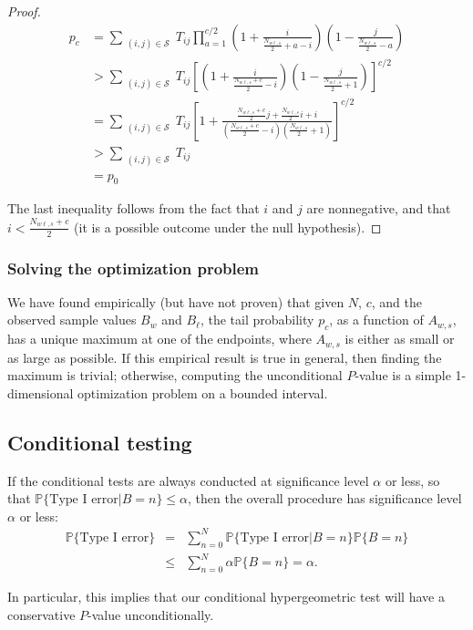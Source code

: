 \documentclass[runningheads]{llncs}
\begin{document}
\begin{proof}
\begin{align*}
p_c &= \sum_{\substack{(i, j) \in \mathcal{S}}} T_{ij} \prod_{a=1}^{c/2} \left(1 + \frac{i}{\frac{N_{w\ell,s}}{2} + a-i}\right)\left(1 - \frac{j}{\frac{N_{w\ell, s}}{2} - a}\right) \\
&> \sum_{\substack{(i, j) \in \mathcal{S}}}  T_{ij} \left[ \left(1 + \frac{i}{\frac{N_{w\ell,s}+c}{2} -i}\right)\left(1 - \frac{j}{\frac{N_{w\ell, s}}{2}+1}\right) \right]^{c/2} \\
&= \sum_{\substack{(i, j) \in \mathcal{S}}} T_{ij} \left[ 1 + \frac{\frac{N_{w\ell,s}+c}{2}j + \frac{N_{w\ell,s}}{2}i + i}{(\frac{N_{w\ell,s}+c}{2}-i)(\frac{N_{w\ell,s}}{2}+1)}\right]^{c/2} \\
&> \sum_{\substack{(i, j) \in \mathcal{S}}}  T_{ij}\\
&= p_0
\end{align*}

The last inequality follows from the fact that $i$ and $j$ are nonnegative, and 
that $i < \frac{N_{w\ell,s}+c}{2}$ (it is a possible outcome under the null hypothesis).


\end{proof}

\subsubsection{Solving the optimization problem}

We have found empirically (but have not proven) that given $N$, $c$, and the observed sample values $B_w$ and $B_\ell$, the tail probability $p_c$, as a function of $A_{w,s}$,
has a unique maximum at one of the endpoints, where $A_{w,s}$ is either as small or as large as possible.
If this empirical result is true in general, then finding the maximum is trivial;
otherwise, computing the unconditional $P$-value is a simple 1-dimensional optimization problem
on a bounded interval.

\subsection{Conditional testing}
If the conditional tests are always conducted at significance level $\alpha$ or less, so that
$\mathbb{P} \{\mbox{Type I error} | B = n\} \le \alpha$, then the
overall procedure has significance level $\alpha$ or less:
\begin{eqnarray}
    \mathbb{P} \{\mbox{Type I error}\} &=& \sum_{n=0}^N  \mathbb{P}\{\mbox{Type I error} |  B = n\} \mathbb{P} \{ B = n \} \nonumber \\
       & \le & \sum_{n=0}^N \alpha \mathbb{P} \{  B = n \}  =  \alpha.
\end{eqnarray}

In particular, this implies that our conditional hypergeometric test will have a conservative $P$-value unconditionally.





\end{document}
